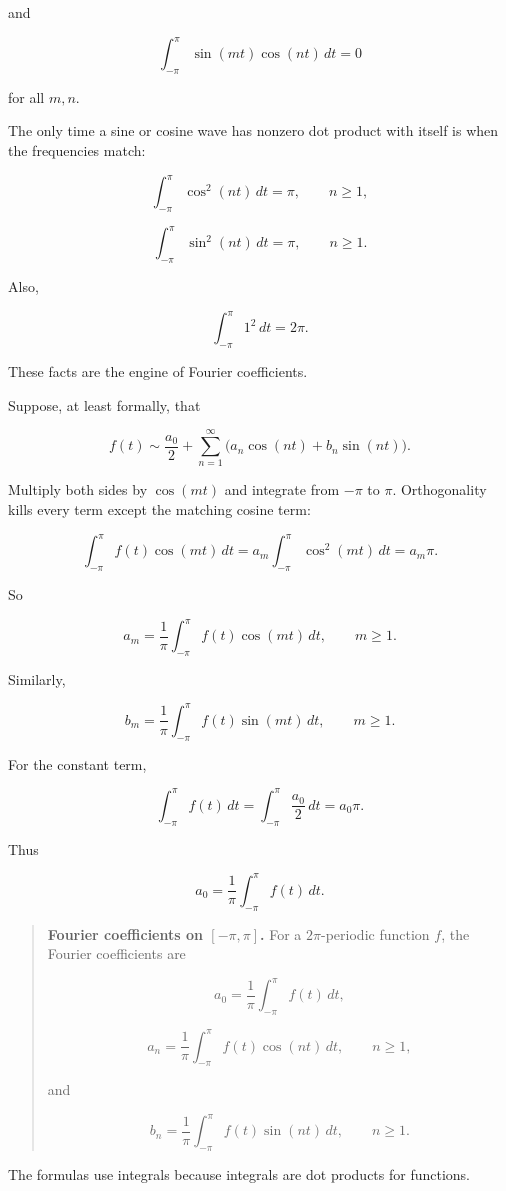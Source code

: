 and

\[
\int_{-\pi}^{\pi}\sin(mt)\cos(nt)\,dt=0
\]

for all \(m,n\).

The only time a sine or cosine wave has nonzero dot product with itself is when the
frequencies match:

\[
\int_{-\pi}^{\pi}\cos^2(nt)\,dt=\pi,
\qquad n\ge1,
\]

\[
\int_{-\pi}^{\pi}\sin^2(nt)\,dt=\pi,
\qquad n\ge1.
\]

Also,

\[
\int_{-\pi}^{\pi}1^2\,dt=2\pi.
\]

These facts are the engine of Fourier coefficients.

Suppose, at least formally, that

\[
f(t)
\sim
\frac{a_0}{2}
+
\sum_{n=1}^{\infty}
\bigl(a_n\cos(nt)+b_n\sin(nt)\bigr).
\]

Multiply both sides by \(\cos(mt)\) and integrate from \(-\pi\) to \(\pi\).  Orthogonality
kills every term except the matching cosine term:

\[
\int_{-\pi}^{\pi} f(t)\cos(mt)\,dt
=
a_m\int_{-\pi}^{\pi}\cos^2(mt)\,dt
=
a_m\pi.
\]

So

\[
\boxed{
a_m=
\frac1\pi
\int_{-\pi}^{\pi} f(t)\cos(mt)\,dt,
\qquad m\ge1.
}
\]

Similarly,

\[
\boxed{
b_m=
\frac1\pi
\int_{-\pi}^{\pi} f(t)\sin(mt)\,dt,
\qquad m\ge1.
}
\]

For the constant term,

\[
\int_{-\pi}^{\pi} f(t)\,dt
=
\int_{-\pi}^{\pi}\frac{a_0}{2}\,dt
=
a_0\pi.
\]

Thus

\[
\boxed{
a_0=
\frac1\pi
\int_{-\pi}^{\pi} f(t)\,dt.
}
\]

\begin{quote}
\textbf{Fourier coefficients on \([-\pi,\pi]\).}
For a \(2\pi\)-periodic function \(f\), the Fourier coefficients are

\[
\boxed{
a_0=
\frac1\pi
\int_{-\pi}^{\pi} f(t)\,dt,
}
\]

\[
\boxed{
a_n=
\frac1\pi
\int_{-\pi}^{\pi} f(t)\cos(nt)\,dt,
\qquad n\ge1,
}
\]

and

\[
\boxed{
b_n=
\frac1\pi
\int_{-\pi}^{\pi} f(t)\sin(nt)\,dt,
\qquad n\ge1.
}
\]
\end{quote}

The formulas use integrals because integrals are dot products for functions.

